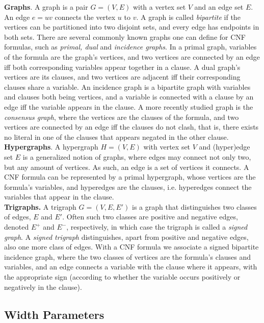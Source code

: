 \documentclass{article}
\begin{document}
\noindent
\textbf{Graphs}.
A graph is a pair $G = (V,E)$ with a vertex set $V$ and an edge set $E$.
An edge $e=uv$ connects the vertex $u$ to $v$.
A graph is called {\em bipartite} if the vertices can be partitioned into two disjoint sets, and every edge has endpoints in both sets.
There are several commonly known graphs one can define for CNF formulas, such as {\em primal, dual} and {\em incidence graphs}.
In a primal graph, variables of the formula are the graph's vertices, and two vertices are connected by an edge iff both corresponding variables appear together in a clause.
A dual graph's vertices are its clauses, and two vertices are adjacent iff their corresponding clauses share a variable.
An incidence graph is a bipartite graph with variables and clauses both being vertices, and a variable is connected with a clause by an edge iff the variable appears in the clause.
A more recently studied graph is the {\em consensus graph}, where the vertices are the clauses of the formula, and two vertices are connected by an edge iff the clauses do not clash, that is, there exists no literal in one of the clauses that appears negated in the other clause.\\

\noindent
\textbf{Hypergraphs}.
A hypergraph $H=(V,E)$ with vertex set $V$ and (hyper)edge set $E$ is a generalized notion of graphs, where edges may connect not only two, but any amount of vertices.
As such, an edge is a set of vertices it connects.
A CNF formula can be represented by a primal hypergraph, whose vertices are the formula's variables, and hyperedges are the clauses, i.e. hyperedges connect the variables that appear in the clause.\\

\noindent
\textbf{Trigraphs.}
A trigraph $G=(V,E,E')$ is a graph that distinguishes two classes of edges, $E$ and $E'$.
Often such two classes are positive and negative edges, denoted $E^+$ and $E^-$, respectively, in which case the trigraph is called a {\em signed graph}.
A {\em signed trigraph} distinguishes, apart from positive and negative edges, also one more class of edges.
With a CNF formula we associate a signed bipartite incidence graph, where the two classes of vertices are the formula's clauses and variables, and an edge connects a variable with the clause where it appears, with the appropriate sign (according to whether the variable occurs positively or negatively in the clause).

\subsection{Width Parameters}
\end{document}
